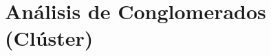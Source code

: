 \documentclass[12pt,oneside]{book}\usepackage[]{graphicx}\usepackage[]{color}
\theoremstyle{definition} %
\begin{document}

\section{Análisis de Conglomerados (Clúster)}



\end{document}
